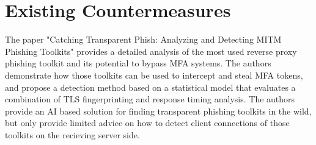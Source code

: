 \documentclass[12pt]{scrbook}
\begin{document}
\section{Existing Countermeasures} The paper "Catching Transparent Phish:
Analyzing and Detecting MITM Phishing Toolkits" \cite{kondracki2021catching}
provides a detailed analysis of the most used reverse proxy phishing toolkit and
its potential to bypass MFA systems. The authors demonstrate how those toolkits
can be used to intercept and steal MFA tokens, and propose a detection method
based on a statistical model that evaluates a combination of TLS fingerprinting
and response timing analysis. The authors provide an AI based solution for
finding transparent phishing toolkits in the wild, but only provide limited
advice on how to detect client connections of those toolkits on the recieving
server side.
\end{document}
